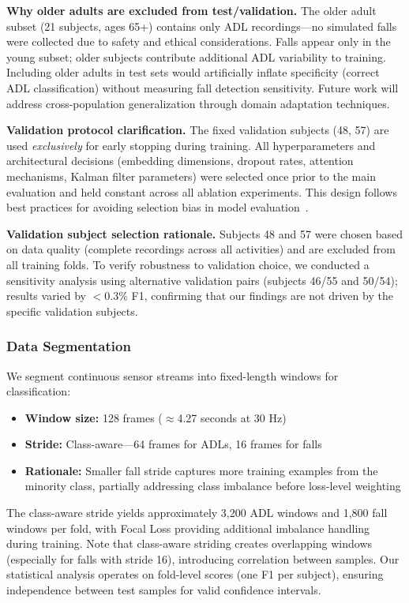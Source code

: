 \textbf{Why older adults are excluded from test/validation.} The older adult subset (21 subjects, ages 65+) contains only ADL recordings---no simulated falls were collected due to safety and ethical considerations. Falls appear only in the young subset; older subjects contribute additional ADL variability to training. Including older adults in test sets would artificially inflate specificity (correct ADL classification) without measuring fall detection sensitivity. Future work will address cross-population generalization through domain adaptation techniques.

\textbf{Validation protocol clarification.} The fixed validation subjects (48, 57) are used \textit{exclusively} for early stopping during training. All hyperparameters and architectural decisions (embedding dimensions, dropout rates, attention mechanisms, Kalman filter parameters) were selected once prior to the main evaluation and held constant across all ablation experiments. This design follows best practices for avoiding selection bias in model evaluation~\cite{cawley2010overfitting}.

\textbf{Validation subject selection rationale.} Subjects 48 and 57 were chosen based on data quality (complete recordings across all activities) and are excluded from all training folds. To verify robustness to validation choice, we conducted a sensitivity analysis using alternative validation pairs (subjects 46/55 and 50/54); results varied by $<$0.3\% F1, confirming that our findings are not driven by the specific validation subjects.

\subsubsection{Data Segmentation}

We segment continuous sensor streams into fixed-length windows for classification:

\begin{itemize}
    \item \textbf{Window size:} 128 frames ($\approx$4.27 seconds at 30 Hz)
    \item \textbf{Stride:} Class-aware---64 frames for ADLs, 16 frames for falls
    \item \textbf{Rationale:} Smaller fall stride captures more training examples from the minority class, partially addressing class imbalance before loss-level weighting
\end{itemize}

The class-aware stride yields approximately 3,200 ADL windows and 1,800 fall windows per fold, with Focal Loss providing additional imbalance handling during training. Note that class-aware striding creates overlapping windows (especially for falls with stride 16), introducing correlation between samples. Our statistical analysis operates on fold-level scores (one F1 per subject), ensuring independence between test samples for valid confidence intervals.

